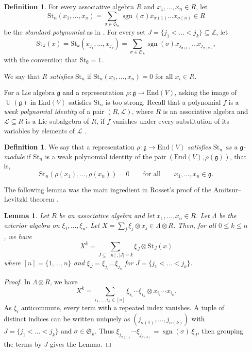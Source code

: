 \documentclass[12pt]{amsart}
\theoremstyle{plain}
\newtheorem{lemma}[theorem]{Lemma}
\theoremstyle{definition}
\newtheorem{definition}[theorem]{Definition}
\numberwithin{equation}{theorem}
\newcommand{\Sg}{\mathfrak S}
\newcommand{\UU}{\operatorname{U}}
\newcommand{\sgn}{\operatorname{sgn}}
\newcommand{\ZZ}{\mathbb{Z}}
\newcommand{\mc}[1]{\mathcal{#1}}
\newcommand{\g}{\mathfrak{g}}
\newcommand{\St}{\mathrm{St}}
\newcommand{\End}{\mathrm{End}}
\newcommand{\length}[1]{\left\lvert #1\right\rvert}
\begin{document}
\begin{definition}\label{def: standard polynomial}
    For every associative algebra $R$ and $x_1, \dots, x_n \in R$, let 
    \begin{equation}
        \St_n(x_1, \dots, x_n) = \sum_{\sigma \in \Sg_n} \sgn(\sigma) x_{\sigma(1)} \dots x_{\sigma(n)} \in R
    \end{equation}
    be the \emph{standard polynomial} as in \cite{AmitsurLevitzki50}. For every set $J = \{j_1 < \dots < j_k\} \subseteq \ZZ$, let 
    \[\St_J (x) = \St_k(x_{j_1}, \dots, x_{j_k})=\sum_{\sigma \in \Sg_k} \sgn(\sigma) x_{j_{\sigma(1)}} \dots x_{j_{\sigma(k)}}
    ,\]
    with the convention that $\St_\emptyset = 1$.

    We say that \emph{$R$ satisfies $\St_n$} if $\St_n(x_1, \dots, x_n) = 0$ for all $x_i \in R$.
\end{definition}
For a Lie algebra $\g$ and a representation $\rho: \g \to \End(V)$, asking the image of $\UU(\g)$ in $\End(V)$ satisfies $\St_n$ is too strong. Recall that a polynomial $f$ is a \emph{weak polynomial identity} of a pair $(R, \mc{L})$, where $R$ is an associative algebra and $\mc{L} \subseteq R$ is a Lie subalgebra of $R$, if $f$ vanishes under every substitution of its variables by elements of $\mc{L}$ \cite{Razmyslov94, Drensky21}.
\begin{definition}\label{def: std adjoint polynomial}
    We say that a representation $\rho \colon \g \to \End(V)$ \emph{satisfies $\St_n$ as a $\g$-module} if $\St_n$ is a weak polynomial identity of the pair $(\End(V), \rho(\g))$, that is,
    \[
        \St_n(\rho(x_1), \dots, \rho(x_n)) = 0 \qquad \text{for all} \qquad x_1, \dots, x_n \in \g.
    \] 
\end{definition}



The following lemma was the main ingredient in Rosset's proof \cite{Rosset76} of the Amitsur--Levitzki theorem \cite{AmitsurLevitzki50}.
\begin{lemma}\label{lem: Rosset}
   Let $R$ be an associative algebra and let $x_1, \dots, x_n \in R$. Let $\Lambda$ be the exterior algebra on $\xi_1, \dots, \xi_n$. Let $X = \sum_{j} \xi_j \otimes x_j \in \Lambda \otimes R$. Then, for all $0 \leq k \leq n$, we have 
    \begin{equation*}
        X^k = \sum_{J \subseteq [n], \length{J}=k} \xi_J \otimes \St_J (x)
    \end{equation*}
    where $[n]=\{1,\ldots, n\}$ and $\xi_J = \xi_{j_1}\dots \xi_{j_k}$ for $J = \{j_1 < \dots < j_k\}$.
\end{lemma}
\begin{proof}
    In $\Lambda \otimes R$, we have 
\[
  X^k = \sum_{i_1, \dots, i_k\in [n]} \xi_{i_1} \cdots \xi_{i_k} \otimes x_{i_1} \cdots x_{i_k}.
\]
As $\xi_i$ anticommute, every term with a repeated index vanishes. A tuple of distinct indices can be written uniquely as $(j_{\sigma(1)}, \dots, j_{\sigma(k)})$ with $J = \{j_1 < \dots < j_k\}$ and $\sigma \in \Sg_k$. Thus $\xi_{j_{\sigma(1)}} \cdots \xi_{j_{\sigma(k)}} = \sgn(\sigma)\, \xi_J$, then grouping the terms by $J$ gives the Lemma.
\end{proof}
\end{document}
